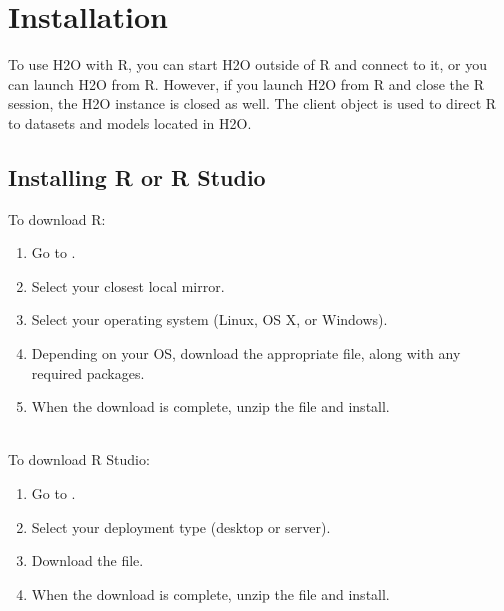 \documentclass[11pt]{article}
\begin{document}
\section{Installation}\label{3}

To use H2O with R, you can start H2O outside of R and connect to it, or you can launch H2O from R. However, if you launch H2O from R and close the R session, the H2O instance is closed as well. The client object is used to direct R to datasets and models located in H2O.

\subsection{Installing R or R Studio}\label{3.1}

To download R:
\begin{enumerate}
\item Go to . 
\item Select your closest local mirror. 
\item Select your operating system (Linux, OS X, or Windows). 
\item Depending on your OS, download the appropriate file, along with any required packages. 
\item When the download is complete, unzip the file and install. \\
\end{enumerate}
\\
\noindent To download R Studio: 
\begin{enumerate}
\item Go to . 
\item Select your deployment type (desktop or server). 
\item Download the file. 
\item When the download is complete, unzip the file and install.
\end{enumerate}
\end{document}
